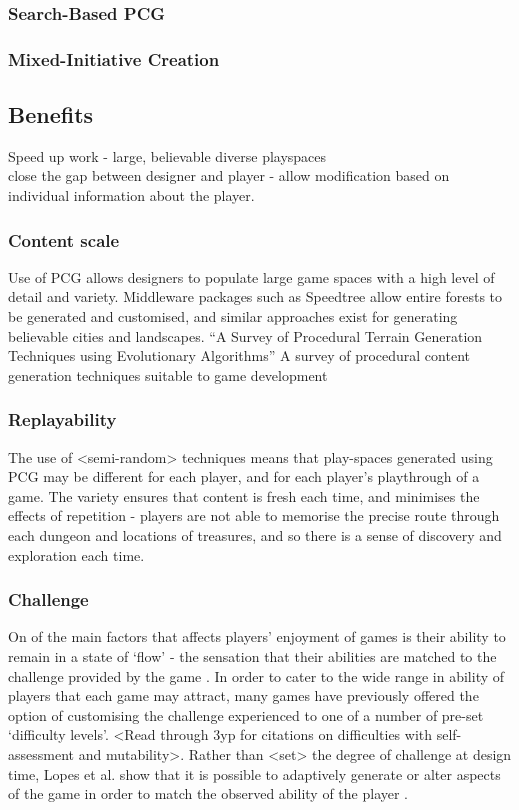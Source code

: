 \documentclass{acm_proc_article-sp}
\begin{document}
\subsubsection{Search-Based PCG}

\subsubsection{Mixed-Initiative Creation}
\cite{mawhorter2010procedural}
\cite{smith2010tanagra}

\subsection{Benefits}
Speed up work - large, believable diverse playspaces\\
close the gap between designer and player - allow modification based on individual information about the player.

\subsubsection{Content scale}
Use of PCG allows designers to populate large game spaces with a high level of detail and variety. Middleware packages such as Speedtree\cite{speedtree} allow entire forests to be generated and customised, and similar approaches exist for generating believable cities and landscapes.
``A Survey of Procedural Terrain Generation Techniques using Evolutionary Algorithms'' \cite{raffe2012survey}
A survey of procedural content generation techniques suitable to game development \cite{carli2011survey}

\subsubsection{Replayability}
The use of <semi-random> techniques means that play-spaces generated using PCG may be different for each player, and for each player's playthrough of a game. The variety ensures that content is fresh each time, and minimises the effects of repetition - players are not able to memorise the precise route through each dungeon and locations of treasures, and so there is a sense of discovery and exploration each time.

\subsubsection{Challenge}
On of the main factors that affects players' enjoyment of games is their ability to remain in a state of `flow' - the sensation that their abilities are matched to the challenge provided by the game \cite{flow}.
In order to cater to the wide range in ability of players that each game may attract, many games have previously offered the option of customising the challenge experienced to one of a number of pre-set `difficulty levels'. <Read through 3yp for citations on difficulties with self-assessment and mutability>. Rather than <set> the degree of challenge at design time, Lopes et al. show that it is possible to adaptively generate or alter aspects of the game \cite{lopes2011adaptivity} in order to match the observed ability of the player \cite{ResE5}.
\end{document}
